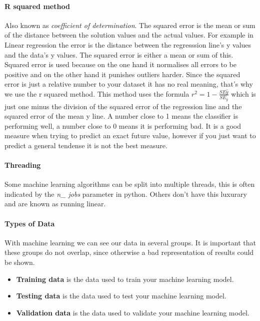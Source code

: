 \paragraph{R squared method}
Also known as \emph{coefficient of determination}. The squared error is the mean or sum of the distance between the solution values and the actual values. For example in Linear regression the error is the distance between the regresssion line's y values and the data's y values. The squared error is either a mean or sum of this. Squared error is used because on the one hand it normalises all errors to be positive and on the other hand it punishes outliers harder. Since the squared error is just a relative number to your dataset it has no real meaning, that's why we use the r squared method. This method uses the formula $r^2 = 1 - \frac{SE\hat{y}}{SE_{\overline{y}}}$ which is just one minus the division of the squared error of the regression line and the squared error of the mean y line. A number close to 1 means the classifier is performing well, a number close to 0 means it is performing bad. It is a good measure when trying to predict an exact future value, however if you just want to predict a general tendense it is not the best measure.

\paragraph{Threading} 
Some machine learning algorithms can be split into multiple threads, this is often indicated by the \emph{n\_ jobs} parameter in python. Others don't have this luxurary and are known as running linear.

\paragraph{Types of Data} 
With machine learning we can see our data in several groups. It is important that these groups do not overlap, since otherwise a bad representation of results could be shown.
\begin{itemize}
	\item \textbf{Training data} is the data used to train your machine learning model.
	\item \textbf{Testing data} is the data used to test your machine learning model.
	\item \textbf{Validation data} is the data used to validate your machine learning model.
\end{itemize}


 
